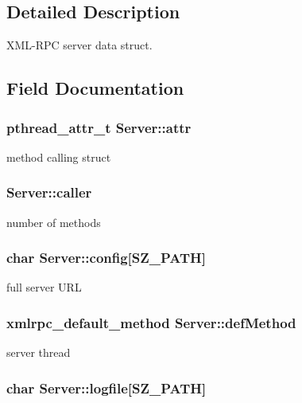 \subsection{Detailed Description}
XML-RPC server data struct. 

\subsection{Field Documentation}
\hypertarget{structServer_922879601b599ff38a9638a72da810fa}{
\subsubsection[{attr}]{\setlength{\rightskip}{0pt plus 5cm}pthread\_\-attr\_\-t {\bf Server::attr}}}
\label{structServer_922879601b599ff38a9638a72da810fa}


method calling struct \hypertarget{structServer_bac1edd9485d6c86e5d6273c9e7efe79}{
\subsubsection[{caller}]{ {\bf Server::caller}}}
\label{structServer_bac1edd9485d6c86e5d6273c9e7efe79}


number of methods \hypertarget{structServer_25c424b3c00a12aefd80dd82dafa1f9f}{
\subsubsection[{config}]{\setlength{\rightskip}{0pt plus 5cm}char {\bf Server::config}\mbox{[}SZ\_\-PATH\mbox{]}}}
\label{structServer_25c424b3c00a12aefd80dd82dafa1f9f}


full server URL \hypertarget{structServer_bafe10e20203238b2f957419066955be}{
\subsubsection[{defMethod}]{\setlength{\rightskip}{0pt plus 5cm}xmlrpc\_\-default\_\-method {\bf Server::defMethod}}}
\label{structServer_bafe10e20203238b2f957419066955be}


server thread \hypertarget{structServer_520e88309f2f48106caa1fb6bacd9b3b}{
\subsubsection[{logfile}]{\setlength{\rightskip}{0pt plus 5cm}char {\bf Server::logfile}\mbox{[}SZ\_\-PATH\mbox{]}}}
\label{structServer_520e88309f2f48106caa1fb6bacd9b3b}


